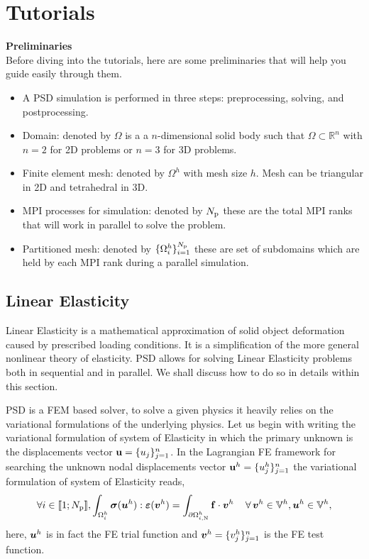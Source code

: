 \chapter{Tutorials}

\textbf{Preliminaries}\\
Before diving into the tutorials, here are some preliminaries that will help you guide easily through them.

\begin{itemize}
    \item A PSD simulation is performed in three steps: preprocessing, solving, and postprocessing. 
    \item Domain: denoted by $\Omega$ is a a $n$-dimensional solid body such that $\Omega \subset \mathbb{R}^n$ with $n=2$   for 2D problems or  $n=3$ for 3D problems.
    \item Finite element mesh: denoted by $\Omega^h$ with mesh size $h$. Mesh can be triangular in 2D and tetrahedral in 3D.
    \item MPI processes for simulation: denoted by $N_\text{p}$ these are the total MPI ranks that will work in parallel to solve the problem.
    \item Partitioned mesh: denoted by $\{ \Omega ^h_i \}_{i=1}^{N_\text{p}}$ these are set of subdomains which are held by each MPI rank during a parallel simulation.
\end{itemize}

\section{Linear Elasticity}
Linear Elasticity is a mathematical approximation of solid object deformation caused by prescribed loading conditions. It is a simplification of the more general nonlinear theory of elasticity. PSD allows for solving Linear Elasticity problems both in sequential and in parallel. We shall discuss how to do so in details within this section.


PSD is a FEM based solver, to solve a given physics it heavily relies on the variational formulations of the underlying physics. Let us begin with writing the variational formulation of system of  Elasticity in which the primary unknown is the displacements vector ${\textbf{u}}=\{u_j\}^n_{j=1}$. In the Lagrangian FE framework for searching the unknown nodal displacements vector ${\textbf{u}}^h=\{u^h_j\}^n_{j=1}$ the variational formulation of system of  Elasticity reads,
%
%
\begin{equation}\label{Eq:Varf}
\forall i \in \llbracket 1; N_{\text p} \rrbracket,  \int_{\Omega^h_i}\boldsymbol{\sigma}(\boldsymbol u^h) : \boldsymbol{\varepsilon}(\boldsymbol v^h) = \int_{\partial\Omega^h_{i,\text{N}}} \mathbf{f}\cdot\boldsymbol v^h \, \quad\forall\,\boldsymbol v^h\in\mathbb{V}^h,\boldsymbol u^h\in\mathbb{V}^h,
\end{equation}
%
here,  $\boldsymbol u^h$ is in fact the FE trial function and $\boldsymbol v^h=\{v^h_j\}^n_{j=1}$ is the FE test function.

